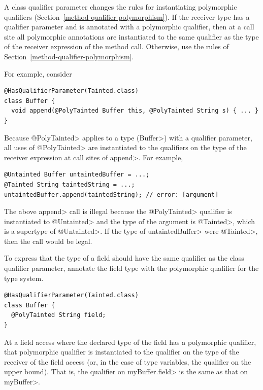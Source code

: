 
A class qualifier parameter changes the rules for instantiating polymorphic
qualifiers (Section~\ref{method-qualifier-polymorphism}).
If the receiver type has a qualifier parameter and is annotated with a polymorphic qualifier,
then at a call site all polymorphic annotations are instantiated to
the same qualifier as the type of the receiver expression of the method call.
Otherwise, use the rules of Section~\ref{method-qualifier-polymorphism}.

For example, consider

\begin{Verbatim}
@HasQualifierParameter(Tainted.class)
class Buffer {
  void append(@PolyTainted Buffer this, @PolyTainted String s) { ... }
}
\end{Verbatim}

\noindent
Because \<@PolyTainted> applies to a type (\<Buffer>) with a qualifier parameter, all
uses of \<@PolyTainted> are instantiated to the qualifiers on the type of
the receiver expression at call sites of \<append>. For example,

\begin{Verbatim}
@Untainted Buffer untaintedBuffer = ...;
@Tainted String taintedString = ...;
untaintedBuffer.append(taintedString); // error: [argument]
\end{Verbatim}
The above \<append> call is illegal because the \<@PolyTainted> qualifier is instantiated to \<@Untainted> and
the type of the argument is \<@Tainted>, which is a supertype of \<@Untainted>.  If the type of
\<untaintedBuffer> were \<@Tainted>, then the call would be legal.


To express that the type of a field
should have the same qualifier as the class qualifier parameter,
annotate the field type with the polymorphic qualifier for the type system.

\begin{Verbatim}
@HasQualifierParameter(Tainted.class)
class Buffer {
  @PolyTainted String field;
}
\end{Verbatim}

At a field access where the declared type of the field has a polymorphic
qualifier, that polymorphic qualifier is instantiated to the qualifier on the
type of the receiver of the field access (or, in the case of type variables, the
qualifier on the upper bound).  That is, the qualifier on \<myBuffer.field>
is the same as that on \<myBuffer>.

